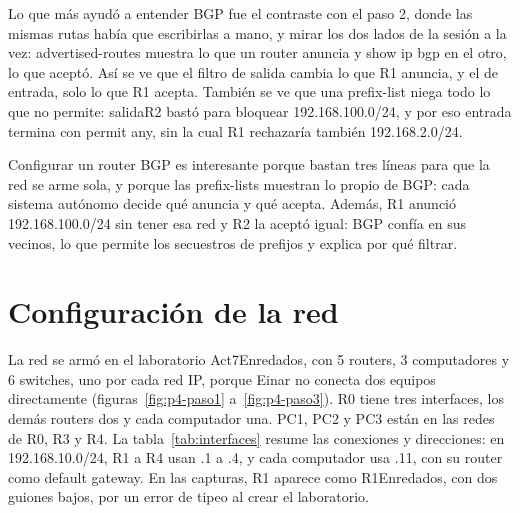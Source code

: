 \documentclass[
	spanish, %
	letterpaper, oneside
]{article}
\newcommand{\codeunderscore}{\textunderscore\allowbreak}
\newcommand{\code}[1]{{\let\_\codeunderscore#1}}     %
\begin{document}
Lo que más ayudó a entender BGP fue el contraste con el paso 2, donde las mismas rutas había que escribirlas a mano, y mirar los dos lados de la sesión a la vez: \code{advertised-routes} muestra lo que un router anuncia y \code{show ip bgp} en el otro, lo que aceptó. Así se ve que el filtro de salida cambia lo que R1 anuncia, y el de entrada, solo lo que R1 acepta. También se ve que una prefix-list niega todo lo que no permite: \code{salida\_R2} bastó para bloquear 192.168.100.0/24, y por eso \code{entrada} termina con \code{permit any}, sin la cual R1 rechazaría también 192.168.2.0/24.

Configurar un router BGP es interesante porque bastan tres líneas para que la red se arme sola, y porque las prefix-lists muestran lo propio de BGP: cada sistema autónomo decide qué anuncia y qué acepta. Además, R1 anunció 192.168.100.0/24 sin tener esa red y R2 la aceptó igual: BGP confía en sus vecinos, lo que permite los secuestros de prefijos y explica por qué filtrar.

\section{Configuración de la red}
La red se armó en el laboratorio \code{Act7\_Enredados}, con 5 routers, 3 computadores y 6 switches, uno por cada red IP, porque Einar no conecta dos equipos directamente (figuras~\ref{fig:p4-paso1} a~\ref{fig:p4-paso3}). R0 tiene tres interfaces, los demás routers dos y cada computador una. PC1, PC2 y PC3 están en las redes de R0, R3 y R4. La tabla~\ref{tab:interfaces} resume las conexiones y direcciones: en 192.168.10.0/24, R1 a R4 usan .1 a .4, y cada computador usa .11, con su router como default gateway. En las capturas, R1 aparece como \code{R1\_\_Enredados}, con dos guiones bajos, por un error de tipeo al crear el laboratorio.
\end{document}
